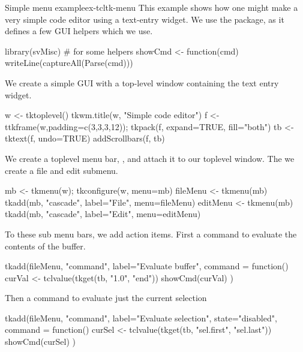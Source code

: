 \begin{example}{Simple menu example}{ex-tcltk-menu}
This example shows how one might make a very simple code editor using a text-entry widget. We use the  package, as it defines a few GUI helpers which we use.
\begin{Schunk}
\begin{Sinput}
 library(svMisc)                         # for some helpers
 showCmd <- function(cmd) writeLine(captureAll(Parse(cmd)))
\end{Sinput}
\end{Schunk}

We create a simple GUI with a top-level window containing the text entry widget.
\begin{Schunk}
\begin{Sinput}
 w <- tktoplevel()
 tkwm.title(w, "Simple code editor")
 f <- ttkframe(w,padding=c(3,3,3,12)); 
 tkpack(f, expand=TRUE, fill="both")
 tb <- tktext(f, undo=TRUE)
 addScrollbars(f, tb)
\end{Sinput}
\end{Schunk}

We create a toplevel menu bar, , and attach it to our toplevel window. The we create a file and edit submenu.
\begin{Schunk}
\begin{Sinput}
 mb <- tkmenu(w); tkconfigure(w, menu=mb)
 fileMenu <- tkmenu(mb)
 tkadd(mb, "cascade", label="File", menu=fileMenu)
 editMenu <- tkmenu(mb)
 tkadd(mb, "cascade", label="Edit", menu=editMenu)
\end{Sinput}
\end{Schunk}

To these sub menu bars, we add action items. First a command to evaluate the contents of the buffer.
\begin{Schunk}
\begin{Sinput}
 tkadd(fileMenu, "command", label="Evaluate buffer",
       command = function() {
         curVal <- tclvalue(tkget(tb, "1.0", "end"))
         showCmd(curVal)
       })
\end{Sinput}
\end{Schunk}

Then a command to evaluate just the current selection
\begin{Schunk}
\begin{Sinput}
 tkadd(fileMenu, "command", label="Evaluate selection",
       state="disabled",
       command = function() {
         curSel <- tclvalue(tkget(tb, "sel.first", "sel.last"))
         showCmd(curSel)
       })
\end{Sinput}
\end{Schunk}


\end{example}
